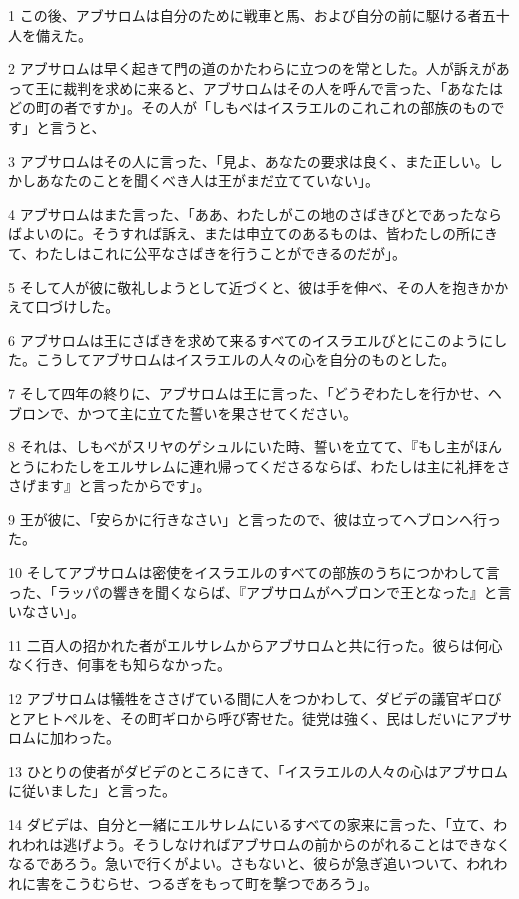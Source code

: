 \par 1 この後、アブサロムは自分のために戦車と馬、および自分の前に駆ける者五十人を備えた。
\par 2 アブサロムは早く起きて門の道のかたわらに立つのを常とした。人が訴えがあって王に裁判を求めに来ると、アブサロムはその人を呼んで言った、「あなたはどの町の者ですか」。その人が「しもべはイスラエルのこれこれの部族のものです」と言うと、
\par 3 アブサロムはその人に言った、「見よ、あなたの要求は良く、また正しい。しかしあなたのことを聞くべき人は王がまだ立てていない」。
\par 4 アブサロムはまた言った、「ああ、わたしがこの地のさばきびとであったならばよいのに。そうすれば訴え、または申立てのあるものは、皆わたしの所にきて、わたしはこれに公平なさばきを行うことができるのだが」。
\par 5 そして人が彼に敬礼しようとして近づくと、彼は手を伸べ、その人を抱きかかえて口づけした。
\par 6 アブサロムは王にさばきを求めて来るすべてのイスラエルびとにこのようにした。こうしてアブサロムはイスラエルの人々の心を自分のものとした。
\par 7 そして四年の終りに、アブサロムは王に言った、「どうぞわたしを行かせ、ヘブロンで、かつて主に立てた誓いを果させてください。
\par 8 それは、しもべがスリヤのゲシュルにいた時、誓いを立てて、『もし主がほんとうにわたしをエルサレムに連れ帰ってくださるならば、わたしは主に礼拝をささげます』と言ったからです」。
\par 9 王が彼に、「安らかに行きなさい」と言ったので、彼は立ってヘブロンへ行った。
\par 10 そしてアブサロムは密使をイスラエルのすべての部族のうちにつかわして言った、「ラッパの響きを聞くならば、『アブサロムがヘブロンで王となった』と言いなさい」。
\par 11 二百人の招かれた者がエルサレムからアブサロムと共に行った。彼らは何心なく行き、何事をも知らなかった。
\par 12 アブサロムは犠牲をささげている間に人をつかわして、ダビデの議官ギロびとアヒトペルを、その町ギロから呼び寄せた。徒党は強く、民はしだいにアブサロムに加わった。
\par 13 ひとりの使者がダビデのところにきて、「イスラエルの人々の心はアブサロムに従いました」と言った。
\par 14 ダビデは、自分と一緒にエルサレムにいるすべての家来に言った、「立て、われわれは逃げよう。そうしなければアブサロムの前からのがれることはできなくなるであろう。急いで行くがよい。さもないと、彼らが急ぎ追いついて、われわれに害をこうむらせ、つるぎをもって町を撃つであろう」。
